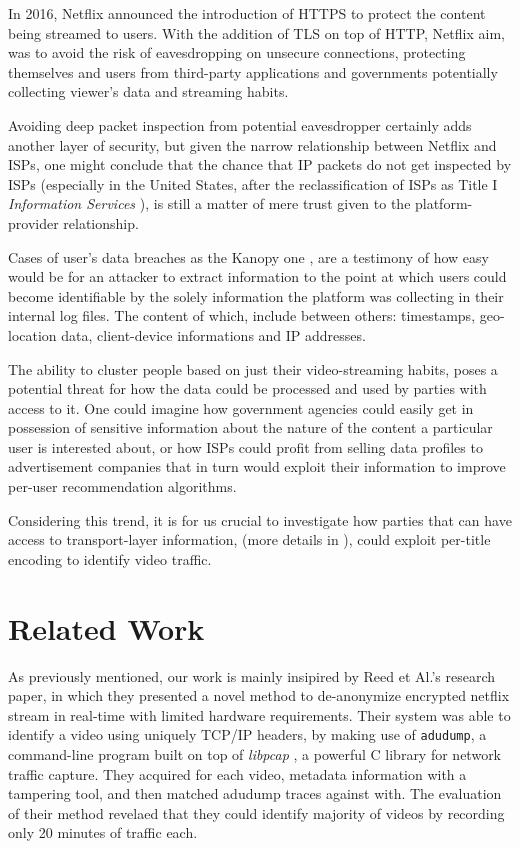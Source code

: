 In 2016, Netflix announced the introduction of HTTPS to protect the content
being streamed to users. With the addition of TLS on top of HTTP, Netflix aim,
was to avoid the risk of eavesdropping on unsecure connections, protecting
themselves and users from third-party applications and governments potentially
collecting viewer's data and streaming habits.

Avoiding deep packet inspection from potential eavesdropper certainly adds
another layer of security, but given the narrow relationship between Netflix
and ISPs, one might conclude that the chance that IP packets do not get
inspected by ISPs (especially in the United States, after the reclassification
of ISPs as Title I \emph{Information Services} \cite{net-neutrality}), is still
a matter of mere trust given to the platform-provider relationship.

Cases of user's data breaches as the Kanopy one \cite{kanopy}, are a testimony
of how easy would be for an attacker to extract information to the point at
which users could become identifiable by the solely information the platform
was collecting in their internal log files. The content of which, include
between others: timestamps, geo-location data, client-device informations and
IP addresses. 

The ability to cluster people based on just their video-streaming habits, poses
a potential threat for how the data could be processed and used by parties with
access to it. One could imagine how government agencies could easily get in
possession of sensitive information about the nature of the content a
particular user is interested about, or how ISPs could profit from selling data
profiles to advertisement companies that in turn would exploit their
information to improve per-user recommendation algorithms.

Considering this trend, it is for us crucial to investigate how parties that
can have access to transport-layer information, (more details in
), could exploit per-title encoding to identify video
traffic. 

\section{Related Work}\label{related}


As previously mentioned, our work is mainly insipired by Reed et Al.'s
\cite{netflix-real-time} research paper, in which they presented a novel method
to de-anonymize encrypted netflix stream in real-time with limited hardware
requirements. Their system was able to identify a video using uniquely TCP/IP
headers, by making use of \texttt{adudump}, a command-line program built on top
of \emph{libpcap} \cite{libpcap}, a powerful C library for network traffic
capture. They acquired for each video, metadata information with a tampering
tool, and then matched adudump traces against with. The evaluation of their
method revelaed that they could identify majority of videos by recording only
20 minutes of traffic each.


